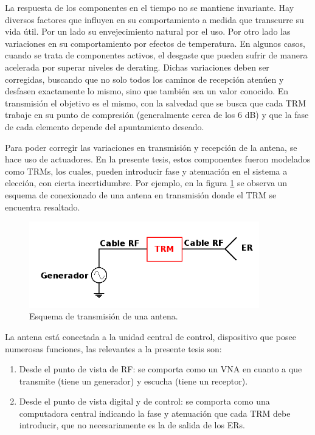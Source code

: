 La respuesta de los componentes en el tiempo no se mantiene invariante. Hay diversos factores que influyen en su comportamiento a
medida que transcurre su vida útil. Por un lado su envejecimiento natural por el uso. Por otro lado las variaciones en su 
comportamiento por efectos de temperatura. En algunos casos, cuando se trata de componentes activos, el desgaste que pueden
sufrir de manera acelerada por superar niveles de derating. Dichas variaciones deben ser corregidas, buscando que no solo todos
los caminos de recepción atenúen y desfasen exactamente lo mismo, sino que también sea un valor conocido. En transmisión el
objetivo es el mismo, con la salvedad que se busca que cada TRM trabaje en su punto de compresión (generalmente cerca de los
6 dB) y que la fase de cada elemento depende del apuntamiento deseado.

Para poder corregir las variaciones en transmisión y recepción de la antena, se hace uso de actuadores. En la presente tesis,
estos componentes fueron modelados como TRMs, los cuales, pueden introducir fase y atenuación en el sistema a elección, con
cierta incertidumbre. Por ejemplo, en la figura \ref{fig:antennaTRM} se observa un esquema 
de conexionado de una antena en transmisión donde el TRM se encuentra resaltado.

\begin{figure}[H]
 \centering
 \includegraphics[width=10cm]{gfx/antennaTRM.png}
 \caption{Esquema de transmisión de una antena.}
 \label{fig:antennaTRM}
\end{figure}

La antena está conectada a la unidad central de control, dispositivo que posee numerosas funciones, las relevantes a la presente tesis 
son:
\begin{enumerate}
	\item Desde el punto de vista de RF: se comporta como un VNA en cuanto a que transmite (tiene un generador) y escucha (tiene un
		receptor).
	\item Desde el punto de vista digital y de control: se comporta como una computadora central indicando la fase y atenuación que
		cada TRM debe introducir, que no necesariamente es la de salida de los ERs.
\end{enumerate}


